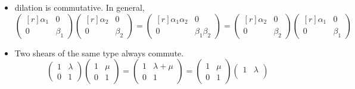 \documentclass[fleqn,a4paper,11pt]{article}
\begin{document}
\begin{enumerate}[label=\textbf{\arabic*.}]
\begin{enumerate}[label=(\alph*)]
\begin{itemize}
\begin{itemize}
         \item
          dilation is commutative. In general,
          \begin{equation*}
           \begin{pmatrix*}[r]
            \alpha_1 & 0 \\
            0 & \beta_1
           \end{pmatrix*}
           \begin{pmatrix*}[r]
            \alpha_2 & 0 \\
            0 & \beta_2
           \end{pmatrix*}
           =
           \begin{pmatrix*}[r]
            \alpha_1 \alpha_2 & 0 \\
            0 & \beta_1 \beta_2
           \end{pmatrix*}
           =
           \begin{pmatrix*}[r]
            \alpha_2 & 0 \\
            0 & \beta_2
           \end{pmatrix*}
           \begin{pmatrix*}[r]
            \alpha_1 & 0 \\
            0 & \beta_1
           \end{pmatrix*}
          \end{equation*}
         \item
          Two shears of the same type always commute.
          \begin{equation*}
           \begin{pmatrix*}
            1 & \lambda \\
            0 & 1
           \end{pmatrix*}
           \begin{pmatrix*}
            1 & \mu \\
            0 & 1
           \end{pmatrix*}
           =
           \begin{pmatrix*}
            1 & \lambda + \mu \\
            0 & 1
           \end{pmatrix*}
           =
           \begin{pmatrix*}
            1 & \mu \\
            0 & 1
           \end{pmatrix*}
           \begin{pmatrix*}
            1 & \lambda \\

\end{pmatrix*}
\end{equation*}
\end{itemize}
\end{itemize}
\end{enumerate}
\end{enumerate}
\end{document}
